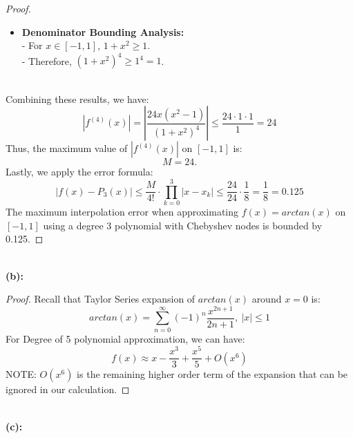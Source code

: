 \documentclass{article}
\begin{document}
\begin{proof}
\begin{itemize}
        \item \textbf{Denominator Bounding Analysis:} 
        \\
        - For \( x \in [-1, 1] \), \( 1 + x^2 \geq 1 \).
        \\
        - Therefore, \( (1 + x^2)^4 \geq 1^4 = 1 \).
    \end{itemize}
    \\
    Combining these results, we have:
    \[
        |f^{(4)}(x)| = \left| \frac{24x(x^2 - 1)}{(1 + x^2)^4} \right| \leq \frac{24 \cdot 1 \cdot 1}{1} = 24
    \]
    Thus, the maximum value of \( |f^{(4)}(x)| \) on \( [-1, 1] \) is:
    \[
        M = 24.
    \]
    Lastly, we apply the error formula:
    \[ |f(x) - P_3(x)| \leq \frac{M}{4!} \cdot \prod_{k=0}^{3}|x - x_k| \leq \frac{24}{24} \cdot \frac{1}{8} = \frac{1}{8} = 0.125 \]
    The maximum interpolation error when approximating $f(x) = arctan(x)$ on $[-1,1]$ using a degree 3 polynomial with Chebyshev nodes is bounded by 0.125.
\end{proof}
\\
\textbf{(b): }
\\
\begin{proof}
    Recall that Taylor Series expansion of $arctan(x)$ around $x = 0$ is:
    \[ arctan(x) = \sum_{n = 0}^{\infty} (-1)^n \frac{x^{2n + 1}}{2n + 1}, \ |x| \leq 1 \]
    For Degree of 5 polynomial approximation, we can have:
    \[ f(x) \approx x - \frac{x^3}{3} + \frac{x^5}{5} + O(x^6) \]
    NOTE: $O(x^6)$ is the remaining higher order term of the expansion that can be ignored in our calculation.
\end{proof}
\\
\textbf{(c): }
\\
\end{document}
